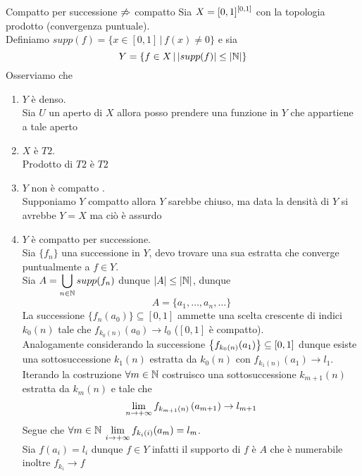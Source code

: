  \begin{ese}Compatto per successione $\not \Rightarrow$ compatto
 \proof Sia $\displaystyle X =[0,1]^{[0,1]}$ con la topologia prodotto (convergenza puntuale).\\
Definiamo $supp(f)=\{ x \in [0,1]\, \vert \, f(x)\neq 0\}$ e sia 
$$ Y = \{ f\in X \, \vert \, \vert supp(f) \vert \leq \vert \mathbb{N} \vert \}$$
Osserviamo che
\begin{enumerate}
\item $Y$ \`e denso.\\
Sia $U$ un aperto di $X$ allora posso prendere una funzione in $Y$ che appartiene a tale aperto 
\item $X$ \`e $T2$.\\
Prodotto di $T2$ \`e $T2$
\item $Y$ non \`e compatto .\\
Supponiamo $Y$ compatto allora $Y$ sarebbe chiuso, ma data la densit\`a di $Y$ si avrebbe  $Y=X$ ma ci\`o \`e assurdo
\item $Y$ \`e compatto per successione.\\
Sia $\{ f_n\}$ una successione in $Y$, devo trovare una sua estratta che converge puntualmente a $f\in Y$.\\
Sia $\displaystyle A=\bigcup_{n \in \mathbb{N}} supp (f_n)$ dunque $\vert A \vert \leq \vert \mathbb{N} \vert $, dunque
$$ A = \{ a_1, \dots, a_n , \dots \}$$
La successione $\{f_n (a_0) \}\subseteq [0,1]$ 
ammette una scelta crescente di indici $k_0(n)$ tale che $f_{k_0(n)}(a_0) \to l_0 $ ($[0,1]$ \`e compatto).\\
Analogamente considerando la successione $\displaystyle \left\{ f_{k_0(n)}(a_1) \right\} \subseteq [0,1]$ dunque esiste una sottosuccessione $k_1(n)$ estratta da $k_0(n)$  con 
$f_{k_1(n)}(a_1)\to l_1$.\\
Iterando la costruzione $\forall m \in \mathbb{N}$ costruisco una sottosuccessione  $k_{m+1}(n)$ estratta da $k_m(n)$ e tale che 
$$\displaystyle \lim_{n \to + \infty} f_{k_{m+1}(n)}\left( a_{m+1} \right) \to l_{m+1}$$
Segue che $\forall m \in \mathbb{N}$ $\displaystyle \lim_{i \to + \infty} f_{k_i(i)}(a_m)=l_m$.\\
Sia $f(a_i)=l_i$ dunque $f \in Y$ infatti il supporto di $f$ \`e $A$ che \`e numerabile inoltre $f_{k_i} \to f $
\end{enumerate}
 \end{ese}
